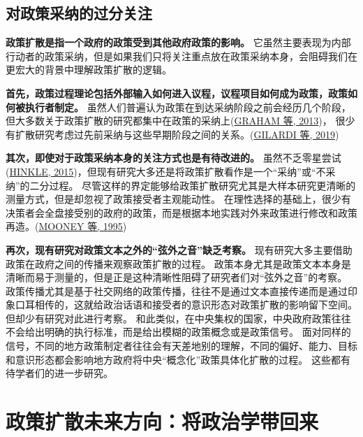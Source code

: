 \documentclass[
  12pt,
]{ctexart}
\begin{document}
\hypertarget{ux5bf9ux653fux7b56ux91c7ux7eb3ux7684ux8fc7ux5206ux5173ux6ce8}{%
\subsection{对政策采纳的过分关注}\label{ux5bf9ux653fux7b56ux91c7ux7eb3ux7684ux8fc7ux5206ux5173ux6ce8}}

\textbf{政策扩散是指一个政府的政策受到其他政府政策的影响。}
它虽然主要表现为内部行动者的政策采纳，但是如果我们只将关注重点放在政策采纳本身，会阻碍我们在更宏大的背景中理解政策扩散的逻辑。

\textbf{首先，政策过程理论包括外部输入如何进入议程，议程项目如何成为政策，政策如何被执行者制定。}
虽然人们普遍认为政策在到达采纳阶段之前会经历几个阶段，
但大多数关于政策扩散的研究都集中在政策的采纳上(\protect\hyperlink{ref-GrahamEtAl2013}{GRAHAM 等, 2013})，
很少有扩散研究考虑过先前采纳与这些早期阶段之间的关系。(\protect\hyperlink{ref-GilardiWasserfallen2019}{GILARDI 等, 2019})

\textbf{其次，即使对于政策采纳本身的关注方式也是有待改进的。}
虽然不乏零星尝试(\protect\hyperlink{ref-Hinkle2015}{HINKLE, 2015})，但现有研究大多还是将政策扩散看作是一个``采纳''或``不采纳''的二分过程。
尽管这样的界定能够给政策扩散研究尤其是大样本研究更清晰的测量方式，但是却忽视了政策接受者主观能动性。
在理性选择的基础上，很少有决策者会全盘接受别的政府的政策，而是根据本地实践对外来政策进行修改和政策再造。(\protect\hyperlink{ref-MooneyLee1995}{MOONEY 等, 1995})

\textbf{再次，现有研究对政策文本之外的``弦外之音''缺乏考察。}
现有研究大多主要借助政策在政府之间的传播来观察政策扩散的过程。
政策本身尤其是政策文本本身是清晰而易于测量的，但是正是这种清晰性阻碍了研究者们对``弦外之音''的考察。
政策传播尤其是基于社交网络的政策传播，往往不是通过文本直接传递而是通过印象口耳相传的，这就给政治话语和接受者的意识形态对政策扩散的影响留下空间。
但却少有研究对此进行考察。
和此类似，在中央集权的国家，中央政府政策往往不会给出明确的执行标准，而是给出模糊的政策概念或是政策信号。
面对同样的信号，不同的地方政策制定者往往会有天差地别的理解，不同的偏好、能力、目标和意识形态都会影响地方政府将中央``概念化''政策具体化扩散的过程。
这些都有待学者们的进一步研究。

\newpage

\hypertarget{ux653fux7b56ux6269ux6563ux672aux6765ux65b9ux5411ux5c06ux653fux6cbbux5b66ux5e26ux56deux6765}{%
\section{政策扩散未来方向：将政治学带回来}\label{ux653fux7b56ux6269ux6563ux672aux6765ux65b9ux5411ux5c06ux653fux6cbbux5b66ux5e26ux56deux6765}}
\end{document}
